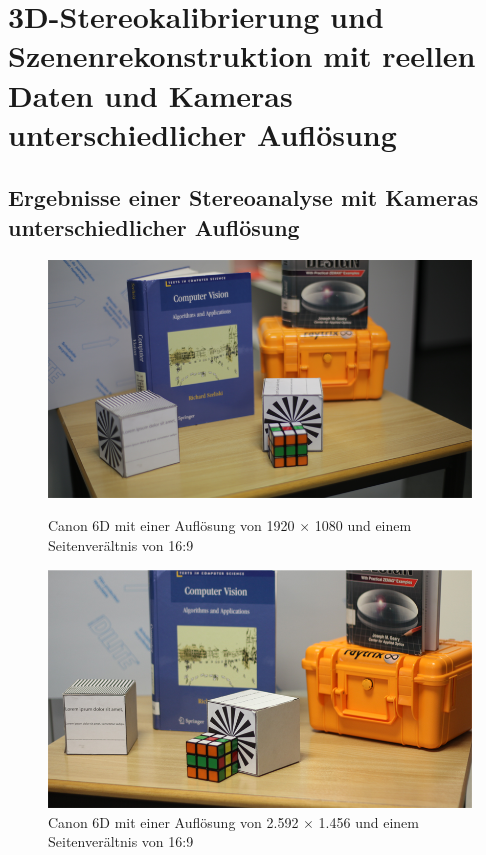\chapter{3D-Stereokalibrierung und Szenenrekonstruktion mit reellen Daten und Kameras unterschiedlicher Auflösung}

\section{Ergebnisse einer Stereoanalyse mit Kameras unterschiedlicher Auflösung}

\begin{figure}[!htb]
	\includegraphics[width=\linewidth]{images/2Cameras2ResolutionsLeft.png}
	\caption{Canon 6D mit einer Auflösung von 1920 $\times$ 1080 und einem Seitenverältnis von 16:9}
	\label{fig:awesome_image1}
	\endminipage\hfill
	\includegraphics[width=\linewidth]{images/2Cameras2ResolutionsRight.png}
	\caption{Canon 6D mit einer Auflösung von 2.592 $\times$ 1.456 und einem Seitenverältnis von 16:9}
	\label{fig:awesome_image2}
	\endminipage\hfill
\end{figure}

